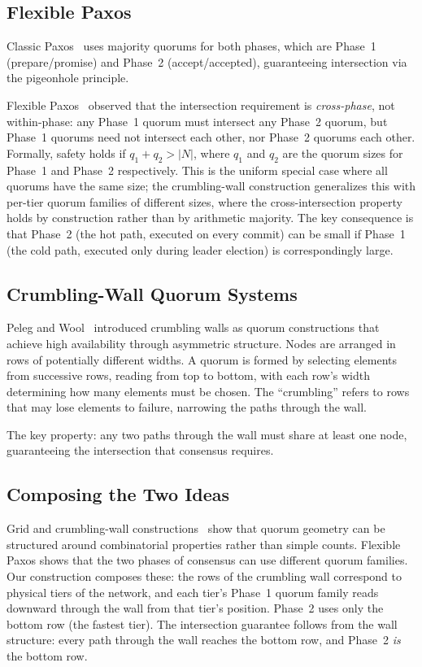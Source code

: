 \documentclass[11pt]{article}
\begin{document}
\subsection{Flexible Paxos}
Classic Paxos~\cite{lamport1998} uses majority quorums for both phases, which are Phase~1 (prepare/promise) and Phase~2 (accept/accepted), guaranteeing intersection via the pigeonhole principle.

Flexible Paxos~\cite{howard2016} observed that the intersection requirement is \emph{cross-phase}, not within-phase: any Phase~1 quorum must intersect any Phase~2 quorum, but Phase~1 quorums need not intersect each other, nor Phase~2 quorums each other. Formally, safety holds if $q_1 + q_2 > |N|$, where $q_1$ and $q_2$ are the quorum sizes for Phase~1 and Phase~2 respectively. This is the uniform special case where all quorums have the same size; the crumbling-wall construction generalizes this with per-tier quorum families of different sizes, where the cross-intersection property holds by construction rather than by arithmetic majority. The key consequence is that Phase~2 (the hot path, executed on every commit) can be small if Phase~1 (the cold path, executed only during leader election) is correspondingly large.

\subsection{Crumbling-Wall Quorum Systems}
Peleg and Wool~\cite{peleg1995} introduced crumbling walls as quorum constructions that achieve high availability through asymmetric structure. Nodes are arranged in rows of potentially different widths. A quorum is formed by selecting elements from successive rows, reading from top to bottom, with each row's width determining how many elements must be chosen. The ``crumbling'' refers to rows that may lose elements to failure, narrowing the paths through the wall.

The key property: any two paths through the wall must share at least one node, guaranteeing the intersection that consensus requires.

\subsection{Composing the Two Ideas}
Grid and crumbling-wall constructions~\cite{cheung1992,peleg1995} show that quorum geometry can be structured around combinatorial properties rather than simple counts. Flexible Paxos shows that the two phases of consensus can use different quorum families. Our construction composes these: the rows of the crumbling wall correspond to physical tiers of the network, and each tier's Phase~1 quorum family reads downward through the wall from that tier's position. Phase~2 uses only the bottom row (the fastest tier). The intersection guarantee follows from the wall structure: every path through the wall reaches the bottom row, and Phase~2 \emph{is} the bottom row.
\end{document}
